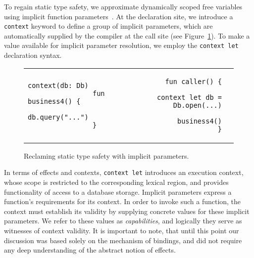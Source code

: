 \documentclass[acmsmall,review,screen]{acmart}
\begin{document}
To regain static type safety, we approximate dynamically scoped free variables using implicit function parameters~\cite{lewis2000implicit}.
At the declaration site, we introduce a \lstinline[language=colang]|context| keyword to define a group of implicit parameters, which are automatically supplied by the compiler at the call site (see Figure\ \ref{fig:implicits}).
To make a value available for implicit parameter resolution, we employ the \lstinline[language=colang]{context let} declaration syntax.

\begin{figure}[h]
    \begin{tabular}{p{} rl}
        \begin{minipage}[t]{0.3\textwidth}
            \begin{lstlisting}[language=colang, gobble=16]
                context(db: Db)
                fun business4() {
                    db.query("...")
                }
            \end{lstlisting}
        \end{minipage}
        &
        \begin{minipage}[t]{0.5\textwidth}
            \begin{lstlisting}[language=colang, gobble=16]
                fun caller() {
                    context let db = Db.open(...)
                    business4()
                }
            \end{lstlisting}
        \end{minipage}
    \end{tabular}
    \caption{Reclaming static type safety with implicit parameters.}
    \label{fig:implicits}
\end{figure}

In terms of effects and contexts, \lstinline[language=colang]|context let| introduces an execution context, whose scope is restricted to the corresponding lexical region, and provides functionality of access to a database storage.
Implicit parameters express a function's requirements for its context.
In order to invoke such a function, the context must establish its validity by supplying concrete values for these implicit parameters.
We refer to these values as \textit{capabilities}, and logically they serve as witnesses of context validity.
It is important to note, that until this point our discussion was based solely on the mechanism of bindings, and did not require any deep understanding of the abstract notion of effects.
\end{document}
